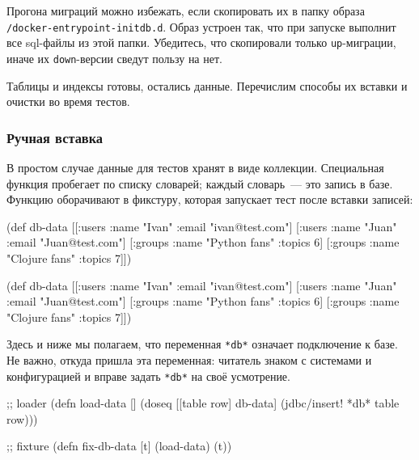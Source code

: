 Прогона миграций можно избежать, если скопировать их в папку образа
\texttt{/docker-entry\-point-initdb.d}. Образ устроен так, что при запуске
выполнит все sql-файлы из этой папки. Убедитесь, что скопировали только
\verb|up|-миграции, иначе их \verb|down|-версии сведут пользу на нет.

Таблицы и индексы готовы, остались данные. Перечислим способы их вставки и
очистки во время тестов.

\subsubsection*{Ручная вставка}

В простом случае данные для тестов хранят в виде коллекции. Специальная функция
пробегает по списку словарей; каждый словарь~--- это запись в базе. Функцию
оборачивают в фикстуру, которая запускает тест после вставки записей:

\ifx\DEVICETYPE\MOBILE

\begin{english}
  \begin{clojure}
(def db-data
 [[:users {:name "Ivan"
           :email "ivan@test.com"}]
  [:users {:name "Juan"
           :email "Juan@test.com"}]
  [:groups {:name "Python fans"
            :topics 6}]
  [:groups {:name "Clojure fans"
            :topics 7}]])
  \end{clojure}
\end{english}

\else

\begin{english}
  \begin{clojure}
(def db-data
  [[:users {:name "Ivan" :email "ivan@test.com"}]
   [:users {:name "Juan" :email "Juan@test.com"}]
   [:groups {:name "Python fans" :topics 6}]
   [:groups {:name "Clojure fans" :topics 7}]])
  \end{clojure}
\end{english}

\fi


Здесь и ниже мы полагаем, что переменная \verb|*db*| означает подключение к
базе. Не важно, откуда пришла эта переменная: читатель знаком с системами и
конфигурацией и вправе задать \verb|*db*| на своё усмотрение.

\begin{english}
  \begin{clojure}
;; loader
(defn load-data []
  (doseq [[table row] db-data]
    (jdbc/insert! *db* table row)))

;; fixture
(defn fix-db-data [t]
  (load-data)
  (t))
  \end{clojure}
\end{english}

